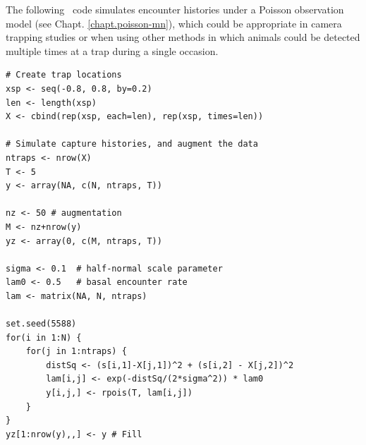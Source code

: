 The following \R~code simulates encounter histories under a
Poisson observation model (see Chapt. \ref{chapt.poisson-mn}), which could be appropriate in camera
trapping studies or when using other methods in which animals could
be detected multiple times at a trap during a single occasion.

\begin{small}
\begin{verbatim}
# Create trap locations
xsp <- seq(-0.8, 0.8, by=0.2)
len <- length(xsp)
X <- cbind(rep(xsp, each=len), rep(xsp, times=len))

# Simulate capture histories, and augment the data
ntraps <- nrow(X)
T <- 5
y <- array(NA, c(N, ntraps, T))

nz <- 50 # augmentation
M <- nz+nrow(y)
yz <- array(0, c(M, ntraps, T))

sigma <- 0.1  # half-normal scale parameter
lam0 <- 0.5   # basal encounter rate
lam <- matrix(NA, N, ntraps)

set.seed(5588)
for(i in 1:N) {
    for(j in 1:ntraps) {
        distSq <- (s[i,1]-X[j,1])^2 + (s[i,2] - X[j,2])^2
        lam[i,j] <- exp(-distSq/(2*sigma^2)) * lam0
        y[i,j,] <- rpois(T, lam[i,j])
    }
}
yz[1:nrow(y),,] <- y # Fill
\end{verbatim}
\end{small}


